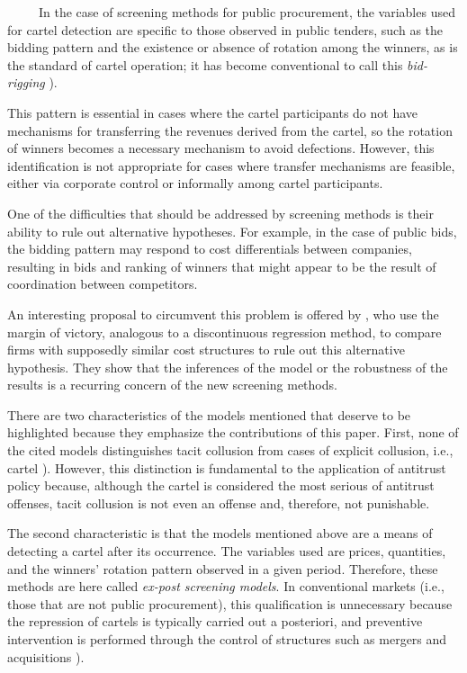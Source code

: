 \documentclass[10pt]{article}
\begin{document}
\ \ \ \ \ In the case of screening methods for public procurement, the variables used for cartel detection are specific to those observed in public tenders, such as the bidding pattern and the existence or absence of rotation among the winners, as is the standard of cartel operation; it has become conventional to call this \textit{bid-rigging}  \cite{imhof2019detecting}).

 This pattern is essential in cases where the cartel participants do not have mechanisms for transferring the revenues derived from the cartel, so the rotation of winners becomes a necessary mechanism to avoid defections. However, this identification is not appropriate for cases where transfer mechanisms are feasible, either via corporate control or informally among cartel participants.

One of the difficulties that should be addressed by screening methods is their ability to rule out alternative hypotheses. For example, in the case of public bids, the bidding pattern may respond to cost differentials between companies, resulting in bids and ranking of winners that might appear to be the result of coordination between competitors.

An interesting proposal to circumvent this problem is offered by  \cite{kawai2019using}, who use the margin of victory, analogous to a discontinuous regression method, to compare firms with supposedly similar cost structures to rule out this alternative hypothesis. They show that the inferences of the model or the robustness of the results is a recurring concern of the new screening methods.

 There are two characteristics of the models mentioned that deserve to be highlighted because they emphasize the contributions of this paper. First, none of the cited models distinguishes tacit collusion from cases of explicit collusion, i.e., cartel  \cite{harrington2008detecting}). However, this distinction is fundamental to the application of antitrust policy because, although the cartel is considered the most serious of antitrust offenses, tacit collusion is not even an offense and, therefore, not punishable.

 The second characteristic is that the models mentioned above are a means of detecting a cartel after its occurrence. The variables used are prices, quantities, and the winners’ rotation pattern observed in a given period. Therefore, these methods are here called \textit{ex-post screening models}. In conventional markets (i.e., those that are not public procurement), this qualification is unnecessary because the repression of cartels is typically carried out a posteriori, and preventive intervention is performed through the control of structures such as mergers and acquisitions  \cite{hovenkamp2005federal}).
\end{document}
